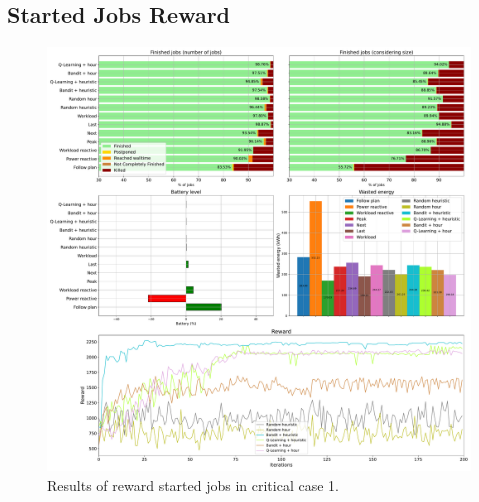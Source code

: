 \subsection{Started Jobs Reward}

\begin{figure}[!htb]
    \centering
    \includegraphics[scale=0.29]{Images/Learning_compensations/reward_started_profile_best_workload_1_with_noise_state_delta.pdf}
    \caption{Results of reward started jobs in critical case 1.}
    \label{fig:started_reward_results_critical_1}
\end{figure}

